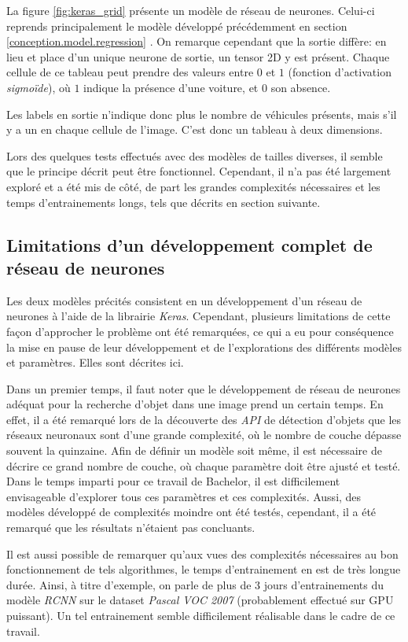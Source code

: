 La figure \ref{fig:keras_grid} présente un modèle de réseau de neurones. Celui-ci reprends principalement le modèle développé précédemment en section \ref{conception.model.regression} . On remarque cependant que la sortie diffère: en lieu et place d'un unique neurone de sortie, un tensor 2D y est présent. Chaque cellule de ce tableau peut prendre des valeurs entre $0$ et $1$ (fonction d'activation \textit{sigmoïde}), où $1$ indique la présence d'une voiture, et $0$ son absence. 

Les labels en sortie n'indique donc plus le nombre de véhicules présents, mais s'il y a un en chaque cellule de l'image. C'est donc un tableau à deux dimensions. 

Lors des quelques tests effectués avec des modèles de tailles diverses, il semble que le principe décrit peut être fonctionnel. Cependant, il n'a pas été largement exploré et a été mis de côté, de part les grandes complexités nécessaires et les temps d'entrainements longs, tels que décrits en section suivante.

\subsection{Limitations d'un développement complet de réseau de neurones}
Les deux modèles précités consistent en un développement d'un réseau de neurones à l'aide de la librairie \textit{Keras}. Cependant, plusieurs limitations de cette façon d'approcher le problème ont été remarquées, ce qui a eu pour conséquence la mise en pause de leur développement et de l'explorations des différents modèles et paramètres. Elles sont décrites ici.

Dans un premier temps, il faut noter que le développement de réseau de neurones adéquat pour la recherche d'objet dans une image prend un certain temps. En effet, il a été remarqué lors de la découverte des \textit{API} de détection d'objets que les réseaux neuronaux sont d'une grande complexité, où le nombre de couche dépasse souvent la quinzaine. Afin de définir un modèle soit même, il est nécessaire de décrire ce grand nombre de couche, où chaque paramètre doit être ajusté et testé. Dans le temps imparti pour ce travail de Bachelor, il est difficilement envisageable d'explorer tous ces paramètres et ces complexités. Aussi, des modèles développé de complexités moindre ont été testés, cependant, il a été remarqué que les résultats n'étaient pas concluants.

Il est aussi possible de remarquer qu'aux vues des complexités nécessaires au bon fonctionnement de tels algorithmes, le temps d'entrainement en est de très longue durée. Ainsi, à titre d'exemple, on parle de plus de 3 jours d'entrainements du modèle \textit{RCNN} sur le dataset \textit{Pascal VOC 2007}\autocite{info:training} (probablement effectué sur GPU puissant). Un tel entrainement semble difficilement réalisable dans le cadre de ce travail.

